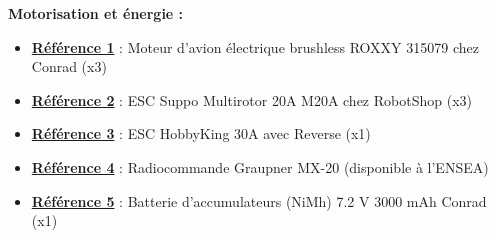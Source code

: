 \documentclass[a4paper,11pt]{report}
\begin{document}
				\textbf{Motorisation et énergie :}
				\begin{itemize}
							\item \textbf{\href{http://www.conrad.fr/ce/fr/product/231891/Moteur-davion-lectrique-brushless-ROXXY-315079?ref=searchDetail}{Référence 1}} : Moteur d'avion électrique brushless ROXXY 315079 chez Conrad (x3)
							\item \textbf{\href{https://www.robotshop.com/eu/fr/esc-multirotor-20a-m20a.html}{Référence 2}} : ESC Suppo Multirotor 20A M20A chez RobotShop (x3)
							\item \textbf{\href{https://hobbyking.com/fr_fr/hobbykingr-tm-brushless-car-esc-30a-w-reverse.html}{Référence 3}} : ESC HobbyKing 30A avec Reverse (x1)
							\item \textbf{\href{https://www.topmodel.fr/product-detail-18656-graupner-mx-20-hott-12160?lang=fr}{Référence 4}} : Radiocommande Graupner MX-20 (disponible à l'ENSEA)
							\item \textbf{\href{http://www.conrad.fr/ce/fr/product/206028/Batterie-daccumulateurs-NiMh-72-V-3000-mAh-Conrad-energy-206028-stick-fiche-Tamiya-mle?ref=searchDetail}{Référence 5}} : Batterie d'accumulateurs (NiMh) 7.2 V 3000 mAh Conrad (x1)
				\end{itemize}



\listoffigures
\end{document}

